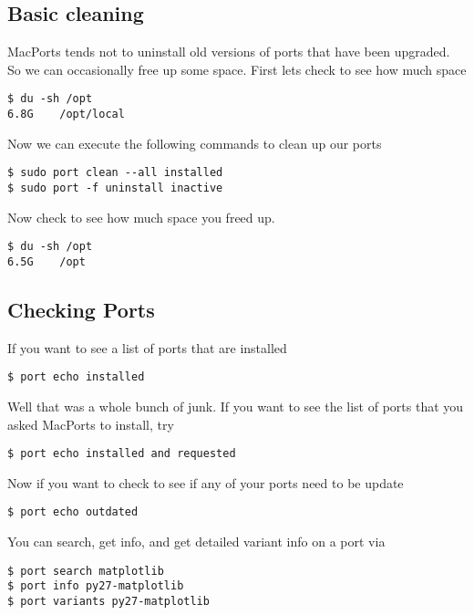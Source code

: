 \documentclass[11pt, A4paper]{article}
\begin{document}
\subsection{Basic cleaning}
MacPorts tends not to uninstall old versions of ports that have been upgraded. So we can occasionally free up some space. First lets check to see how much space
\begin{lstlisting}[style=Bash]
$ du -sh /opt
6.8G	/opt/local
\end{lstlisting}
Now we can execute the following commands to clean up our ports
\begin{lstlisting}[style=Bash]
$ sudo port clean --all installed
$ sudo port -f uninstall inactive
\end{lstlisting}
Now check to see how much space you freed up.
\begin{lstlisting}[style=Bash]
$ du -sh /opt
6.5G	/opt
\end{lstlisting}


\subsection{Checking Ports}
If you want to see a list of ports that are installed
\begin{lstlisting}[style=Bash]
$ port echo installed
\end{lstlisting}
Well that was a whole bunch of junk. If you want to see the list of ports that you asked MacPorts to install, try
\begin{lstlisting}[style=Bash]
$ port echo installed and requested
\end{lstlisting}
Now if you want to check to see if any of your ports need to be update
\begin{lstlisting}[style=Bash]
$ port echo outdated
\end{lstlisting}
You can search, get info, and get detailed variant info on a port via
\begin{lstlisting}[style=Bash]
$ port search matplotlib
$ port info py27-matplotlib
$ port variants py27-matplotlib
\end{lstlisting}
\end{document}
